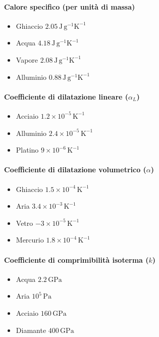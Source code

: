\documentclass[10pt, oneside]{article}
\begin{document}
\paragraph{Calore specifico (per unità di massa)}
\begin{itemize}
\item Ghiaccio \dotfill $ 2.05 \, \mathrm{J \, g^{-1} K^{-1}}$
\item Acqua \dotfill $ 4.18 \, \mathrm{J \, g^{-1} K^{-1}}$
\item Vapore \dotfill $ 2.08 \, \mathrm{J \, g^{-1} K^{-1}}$
\item Alluminio \dotfill $ 0.88 \, \mathrm{J \, g^{-1} K^{-1}}$
\end{itemize}
\paragraph{Coefficiente di dilatazione lineare ($\alpha_L$)}
\begin{itemize}
\item Acciaio \dotfill $1.2 \times 10^{-5} \, \mathrm{K^{-1}}$
\item Alluminio \dotfill $2.4 \times 10^{-5} \, \mathrm{K^{-1}}$
\item Platino \dotfill $9 \times 10^{-6} \, \mathrm{K^{-1}}$
\end{itemize}
\paragraph{Coefficiente di dilatazione volumetrico ($\alpha$)}
\begin{itemize}
\item Ghiaccio \dotfill $1.5 \times 10^{-4} \, \mathrm{K^{-1}}$
\item Aria \dotfill $3.4 \times 10^{-3} \, \mathrm{K^{-1}}$
\item Vetro \dotfill $-3 \times 10^{-5} \, \mathrm{K^{-1}}$
\item Mercurio \dotfill $1.8 \times 10^{-4}\, \mathrm{K^{-1}}$
\end{itemize}
\paragraph{Coefficiente di comprimibilità isoterma ($k$)}
\begin{itemize}
\item Acqua \dotfill $2.2 \, \mathrm{GPa}$
\item Aria \dotfill $10^{5} \, \mathrm{Pa}$
\item Acciaio \dotfill $ 160 \, \mathrm{GPa}$ 
\item Diamante \dotfill $400 \, \mathrm{GPa}$
\end{itemize}
\end{document}

